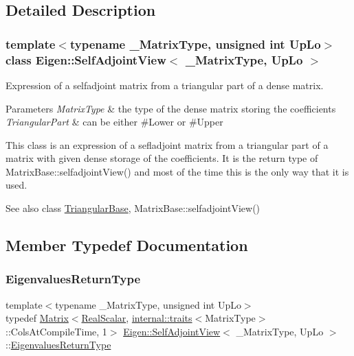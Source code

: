 \subsection{Detailed Description}
\subsubsection*{template$<$typename \+\_\+\+Matrix\+Type, unsigned int Up\+Lo$>$\newline
class Eigen\+::\+Self\+Adjoint\+View$<$ \+\_\+\+Matrix\+Type, Up\+Lo $>$}

Expression of a selfadjoint matrix from a triangular part of a dense matrix. 


\begin{DoxyParams}{Parameters}
{\em Matrix\+Type} & the type of the dense matrix storing the coefficients \\
\hline
{\em Triangular\+Part} & can be either {\ttfamily \#\+Lower} or {\ttfamily \#\+Upper} \\
\hline
\end{DoxyParams}
This class is an expression of a sefladjoint matrix from a triangular part of a matrix with given dense storage of the coefficients. It is the return type of Matrix\+Base\+::selfadjoint\+View() and most of the time this is the only way that it is used.

\begin{DoxySeeAlso}{See also}
class \mbox{\hyperlink{class_eigen_1_1_triangular_base}{Triangular\+Base}}, Matrix\+Base\+::selfadjoint\+View() 
\end{DoxySeeAlso}


\subsection{Member Typedef Documentation}
\mbox{\label{class_eigen_1_1_self_adjoint_view_a8ae92703d920130b38a383f8b165146c}} 
\subsubsection{\texorpdfstring{EigenvaluesReturnType}{EigenvaluesReturnType}}
{\footnotesize\ttfamily template$<$typename \+\_\+\+Matrix\+Type, unsigned int Up\+Lo$>$ \\
typedef \mbox{\hyperlink{class_eigen_1_1_matrix}{Matrix}}$<$\mbox{\hyperlink{class_eigen_1_1_self_adjoint_view_af9f0234ebeae4c4ca512bcd5fb5e8bb1}{Real\+Scalar}}, \mbox{\hyperlink{struct_eigen_1_1internal_1_1traits}{internal\+::traits}}$<$Matrix\+Type$>$\+::Cols\+At\+Compile\+Time, 1$>$ \mbox{\hyperlink{class_eigen_1_1_self_adjoint_view}{Eigen\+::\+Self\+Adjoint\+View}}$<$ \+\_\+\+Matrix\+Type, Up\+Lo $>$\+::\mbox{\hyperlink{class_eigen_1_1_self_adjoint_view_a8ae92703d920130b38a383f8b165146c}{Eigenvalues\+Return\+Type}}}

